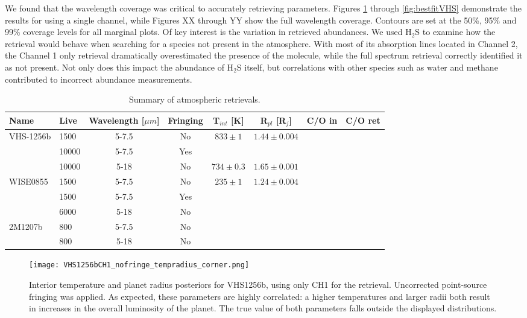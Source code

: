 We found that the wavelength coverage was critical to accurately retrieving parameters. Figures \ref{fig:postVHS_tr} through \ref{fig:bestfitVHS} demonstrate the results for using a single channel, while Figures XX through YY show the full wavelength coverage.
Contours are set at the 50\%, 95\% and 99\% coverage levels for all marginal plots.
Of key interest is the variation in retrieved abundances.
We used H$_{2}$S to examine how the retrieval would behave when searching for a species not present in the atmosphere. 
With most of its absorption lines located in Channel 2, the Channel 1 only retrieval dramatically overestimated the presence of the molecule, while the full spectrum retrieval correctly identified it as not present.
Not only does this impact the abundance of H$_{2}$S itself, but correlations with other species such as water and methane contributed to incorrect abundance measurements.


\begin{table}[t]
	\begin{scriptsize}
	\begin{tabular}{l|lcccccc}
		\toprule
		\textbf{Name} & \textbf{Live} & \textbf{Wavelength [$\mu m$]} & \textbf{Fringing} & \textbf{T$_{int}$ [K]} & \textbf{R$_{pl}$ [R$_{j}$]} & \textbf{C/O in} & \textbf{C/O ret}\\
		\midrule
		\multirow{3}{*}{VHS-1256b} & 1500 & 5-7.5  & No  & $833\pm1$   & $1.44\pm0.004$ &&\\
		                           & 10000 & 5-7.5 & Yes &  &&&\\
		                           & 10000 & 5-18  & No  & $734\pm0.3$ & $1.65\pm0.001$ &&\\
		                           \midrule
		\multirow{3}{*}{WISE0855}  & 1500 & 5-7.5  & No  & $235\pm1$   & $1.24\pm0.004$ &&\\
								   & 1500 & 5-7.5  & Yes &  &&&\\
							       & 6000 & 5-18   & No  &  &&&\\
							       \midrule
		\multirow{3}{*}{2M1207b}   & 800 & 5-7.5   & No  &  &&&\\
								   & 800 & 5-18    & No  &  &&&\\
		\bottomrule
	\end{tabular}
	\caption{Summary of atmospheric retrievals.}
	\label{tab:atmosum}
	\end{scriptsize}
\end{table}

\begin{figure}[t]
	\centering
	\texttt{[image: VHS1256bCH1\_nofringe\_tempradius\_corner.png]}
	\caption{Interior temperature and planet radius posteriors for VHS1256b, using only CH1 for the retrieval. Uncorrected point-source fringing was applied. As expected, these parameters are highly correlated: a higher temperatures and larger radii both result in increases in the overall luminosity of the planet. The true value of both parameters falls outside the displayed distributions.}
	\label{fig:postVHS_tr}
\end{figure}

